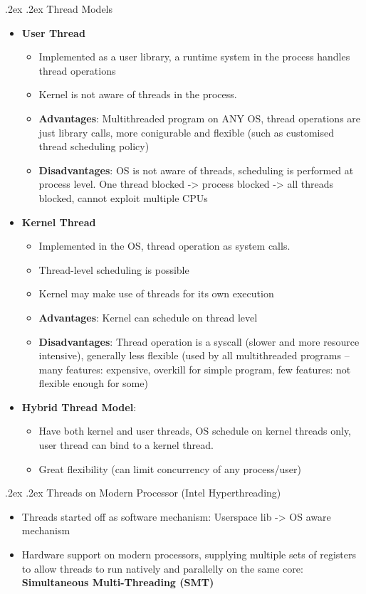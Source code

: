 \documentclass[10pt,landscape,a4paper]{article}
\makeatletter
\renewcommand{\subsection}{\@startsection{subsection}{1}{0mm}%
  {.2ex}%
  {.2ex}%
{\sffamily\bfseries}}
\makeatother
\begin{document}
\begin{multicols*}{4}
  \subsection{Thread Models}
  \begin{itemize}
    \item \textbf{User Thread}
    \begin{itemize}
      \item Implemented as a user library, a runtime system in the process handles thread operations
      \item Kernel is not aware of threads in the process.
      \item \textbf{Advantages}: Multithreaded program on ANY OS, thread operations are just library calls, more conigurable and flexible (such as customised thread scheduling policy)
      \item \textbf{Disadvantages}: OS is not aware of threads, scheduling is performed at process level. One thread blocked -> process blocked -> all threads blocked, cannot exploit multiple CPUs
    \end{itemize}
    \item \textbf{Kernel Thread}
    \begin{itemize}
      \item Implemented in the OS, thread operation as system calls.
      \item Thread-level scheduling is possible
      \item Kernel may make use of threads for its own execution
      \item \textbf{Advantages}: Kernel can schedule on thread level
      \item \textbf{Disadvantages}: Thread operation is a syscall (slower and more resource intensive), generally less flexible (used by all multithreaded programs -- many features: expensive, overkill for simple program, few features: not flexible enough for some)
    \end{itemize}
    \item \textbf{Hybrid Thread Model}:
    \begin{itemize}
      \item Have both kernel and user threads, OS schedule on kernel threads only, user thread can bind to a kernel thread.
      \item Great flexibility (can limit concurrency of any process/user)
    \end{itemize}
  \end{itemize}
  \subsection{Threads on Modern Processor (Intel Hyperthreading)}
  \begin{itemize}
    \item Threads started off as software mechanism: Userspace lib -> OS aware mechanism
    \item Hardware support on modern processors, supplying multiple sets of registers to allow threads to run natively and parallelly on the same core: \textbf{Simultaneous Multi-Threading (SMT)}
  \end{itemize}

\end{multicols*}
\end{document}
